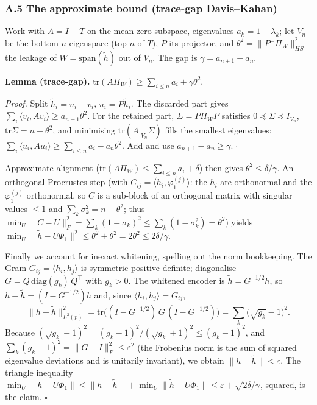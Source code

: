 \documentclass[
  letterpaper,
  11pt]{article}
\theoremstyle{plain}
\theoremstyle{definition}
\theoremstyle{remark}
\begin{document}
\subsubsection{A.5 The approximate bound (trace-gap Davis--Kahan)}\label{sec:A5}

Work with \(A=I-T\) on the mean-zero subspace, eigenvalues \(a_k=1-\lambda_k\); let \(V_n\) be the bottom-\(n\) eigenspace (top-\(n\) of \(T\)), \(P\) its projector, and \(\theta^2=\|P^\perp\Pi_W\|_{HS}^2\) the leakage of \(W=\mathrm{span}(\tilde h)\) out of \(V_n\). The gap is \(\gamma=a_{n+1}-a_n\).

\textbf{Lemma (trace-gap).} \(\mathrm{tr}(A\Pi_W)\ge \sum_{i\le n}a_i + \gamma\theta^2\).

\emph{Proof.} Split \(\tilde h_i=u_i+v_i\), \(u_i=P\tilde h_i\). The discarded part gives \(\sum_i\langle v_i,Av_i\rangle\ge a_{n+1}\theta^2\). For the retained part, \(\Sigma=P\Pi_WP\) satisfies \(0\preceq\Sigma\preceq I_{V_n}\), \(\mathrm{tr}\Sigma=n-\theta^2\), and minimising \(\mathrm{tr}(A|_{V_n}\Sigma)\) fills the smallest eigenvalues: \(\sum_i\langle u_i,Au_i\rangle\ge\sum_{i\le n}a_i - a_n\theta^2\). Add and use \(a_{n+1}-a_n\ge\gamma\). \(\square\)

Approximate alignment (\(\mathrm{tr}(A\Pi_W)\le\sum_{i\le n}a_i+\delta\)) then gives \(\theta^2\le\delta/\gamma\). An orthogonal-Procrustes step (with \(C_{ij}=\langle\tilde h_i,\varphi_1^{(j)}\rangle\): the \(\tilde h_i\) are orthonormal and the \(\varphi_1^{(j)}\) orthonormal, so \(C\) is a sub-block of an orthogonal matrix with singular values \(\le 1\) and \(\sum_k\sigma_k^2 = n-\theta^2\); thus \(\min_U\|C-U\|_F^2 = \sum_k(1-\sigma_k)^2 \le \sum_k(1-\sigma_k^2)=\theta^2\)) yields \(\min_U\|\tilde h-U\Phi_1\|^2 \le \theta^2 + \theta^2 = 2\theta^2 \le 2\delta/\gamma\).

Finally we account for inexact whitening, spelling out the norm bookkeeping. The Gram \(G_{ij}=\langle h_i,h_j\rangle\) is symmetric positive-definite; diagonalise \(G=Q\,\mathrm{diag}(g_k)\,Q^\top\) with \(g_k>0\). The whitened encoder is \(\tilde h = G^{-1/2}h\), so \(h-\tilde h = (I-G^{-1/2})h\) and, since \(\langle h_i,h_j\rangle=G_{ij}\),
\[\|h-\tilde h\|_{L^2(p)}^2 = \mathrm{tr}\!\big((I-G^{-1/2})\,G\,(I-G^{-1/2})\big) = \sum_k\big(\sqrt{g_k}-1\big)^2 .\]
Because \((\sqrt{g_k}-1)^2 = (g_k-1)^2/(\sqrt{g_k}+1)^2 \le (g_k-1)^2\), and \(\sum_k(g_k-1)^2 = \|G-I\|_F^2 \le \varepsilon^2\) (the Frobenius norm is the sum of squared eigenvalue deviations and is unitarily invariant), we obtain \(\|h-\tilde h\|\le\varepsilon\). The triangle inequality \(\min_U\|h-U\Phi_1\| \le \|h-\tilde h\| + \min_U\|\tilde h-U\Phi_1\| \le \varepsilon+\sqrt{2\delta/\gamma}\), squared, is the claim. \(\square\)
\end{document}
